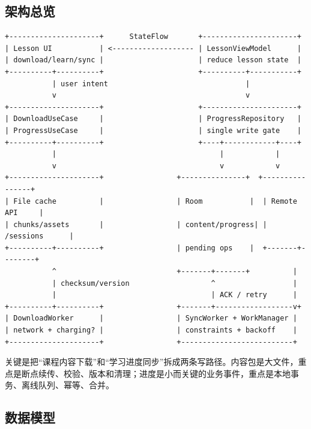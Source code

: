 \subsection{架构总览}

\begin{lstlisting}
+---------------------+      StateFlow       +----------------------+
| Lesson UI           | <------------------- | LessonViewModel      |
| download/learn/sync |                      | reduce lesson state  |
+----------+----------+                      +----------+-----------+
           | user intent                                |
           v                                            v
+---------------------+                      +----------------------+
| DownloadUseCase     |                      | ProgressRepository   |
| ProgressUseCase     |                      | single write gate    |
+----------+----------+                      +----+------------+----+
           |                                      |            |
           v                                      v            v
+---------------------+                 +---------------+  +----------------+
| File cache          |                 | Room           |  | Remote API     |
| chunks/assets       |                 | content/progress| | /sessions      |
+----------+----------+                 | pending ops    |  +-------+--------+
           ^                            +-------+-------+          |
           | checksum/version                   ^                  |
           |                                    | ACK / retry      |
+----------+----------+                 +-------+------------------v+
| DownloadWorker      |                 | SyncWorker + WorkManager |
| network + charging? |                 | constraints + backoff    |
+---------------------+                 +--------------------------+
\end{lstlisting}

关键是把“课程内容下载”和“学习进度同步”拆成两条写路径。内容包是大文件，重点是断点续传、校验、版本和清理；进度是小而关键的业务事件，重点是本地事务、离线队列、幂等、合并。

\subsection{数据模型}

